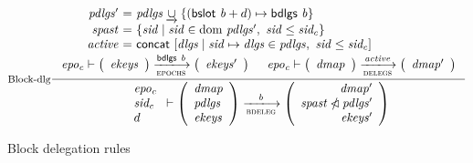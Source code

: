 \begin{figure}
  \begin{equation}
    \label{eq:rule:block-delegation}
    \inference[Block-dlg]
    {
      {\begin{array}{r@{~=~}l}
         \var{pdlgs'} & \var{pdlgs} \unionoverride \{(\bslot{b} + d) \mapsto \bdlgs{b} \}\\
         \var{spast} & \{ \var{sid} \mid \var{sid} \in \var \dom ~ \var{pdlgs'}
                       ,~ \var{sid} \leq \var{sid_c}\}\\
         \var{active} &  \fun{concat}~ [ \var{dlgs} \mid \var{sid} \mapsto \var{dlgs} \in \var{pdlgs}
                                          ,~ \var{sid} \leq \var{sid_c}]
      \end{array}} & \\
      \var{epo_c} \vdash
      {
        \left(
          \begin{array}{l}
            \var{ekeys}
          \end{array}
        \right)
      }
      \trans{epochs}{\bdlgs{b}}
      {
        \left(
          \begin{array}{r}
            \var{ekeys'}
          \end{array}
        \right)
      } & 
      \var{epo_c} \vdash
      {
        \left(
          \begin{array}{l}
            \var{dmap}
          \end{array}
        \right)
      }
      \trans{delegs}{\var{active}}
      {
        \left(
          \begin{array}{r}
            \var{dmap'}
          \end{array}
        \right)
      }     
    }
    {
      \begin{array}{l}
        \var{epo_c}\\
        \var{sid_c}\\
        d
      \end{array}
      \vdash
      {
        \left(
          \begin{array}{l}
            \var{dmap}\\
            \var{pdlgs}\\
            \var{ekeys}
          \end{array}
        \right)
      }
      \trans{bdeleg}{b}
      {
        \left(
          \begin{array}{r}
            \var{dmap'}\\
            \var{\var{spast} \subtractdom pdlgs'}\\
            \var{ekeys'}
          \end{array}
        \right)
      }
    }
  \end{equation}
  \caption{Block delegation rules}
  \label{fig:rules:block-delegation}
\end{figure}

